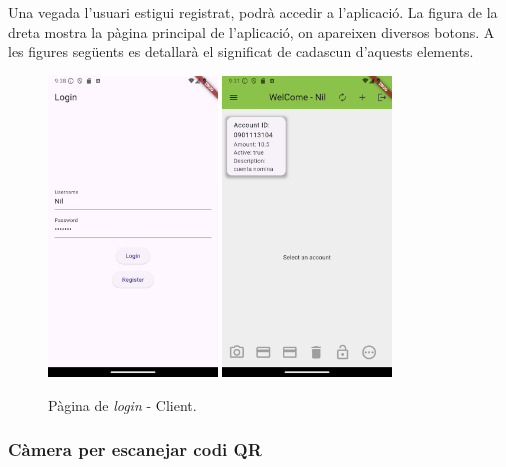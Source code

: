\documentclass[a4paper,12pt,twoside]{ThesisStyle}
\begin{document}
Una vegada l'usuari estigui registrat, podrà accedir a l'aplicació. La figura de la dreta mostra la pàgina principal de l'aplicació, on apareixen diversos botons. A les figures següents es detallarà el significat de cadascun d'aquests elements.

\begin{figure}[h]
    \centering
    \includegraphics[width=0.4\textwidth]{imatges/loginNil.png}
    \includegraphics[width=0.4\textwidth]{imatges/mainPage.png}
    \caption{Pàgina de \textit{login} - Client.}
    \label{fig: Pàgina de login - client}
\end{figure}

\clearpage

\subsubsection{Càmera per escanejar codi QR}
\label{subsubsec:Càmera per escanejar codi QR}
\end{document}
